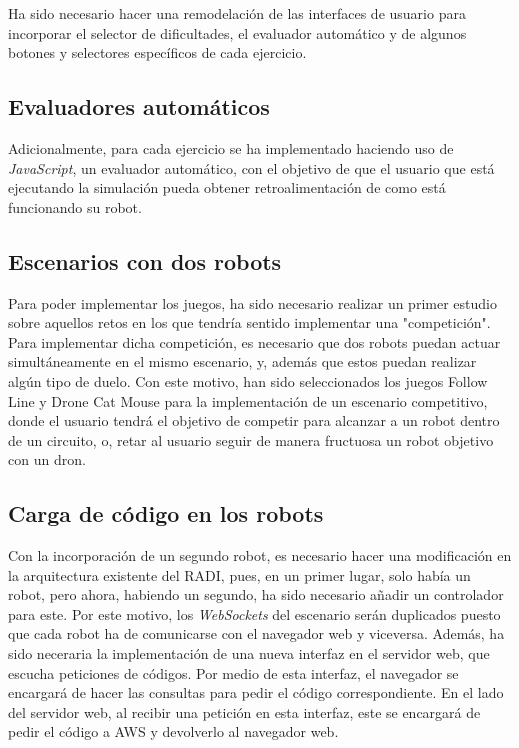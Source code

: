 \documentclass[a4paper, 12pt]{book}
\begin{document}
Ha sido necesario hacer una remodelación de las interfaces de usuario para incorporar el selector de dificultades, el evaluador automático y de algunos botones y selectores específicos de cada ejercicio.

\subsection{Evaluadores automáticos}

Adicionalmente, para cada ejercicio se ha implementado haciendo uso de \emph{JavaScript}, un evaluador automático, con el objetivo de que el usuario que está ejecutando la simulación pueda obtener retroalimentación de como está funcionando su robot.

\subsection{Escenarios con dos robots}

Para poder implementar los juegos, ha sido necesario realizar un primer estudio sobre aquellos retos en los que tendría sentido implementar una "competición".  Para implementar dicha competición, es necesario que dos robots puedan actuar simultáneamente en el mismo escenario, y, además que estos puedan realizar algún tipo de duelo. Con este motivo, han sido seleccionados los juegos Follow Line y Drone Cat Mouse para la implementación de un escenario competitivo, donde el usuario tendrá el objetivo de competir para alcanzar a un robot dentro de un circuito, o, retar al usuario seguir de manera fructuosa un robot objetivo con un dron.

\subsection{Carga de código en los robots}

Con la incorporación de un segundo robot, es necesario hacer una modificación en la arquitectura existente del RADI, pues, en un primer lugar, solo había un robot, pero ahora, habiendo un segundo, ha sido necesario añadir un controlador para este. Por este motivo, los \emph{WebSockets} del escenario serán duplicados puesto que cada robot ha de comunicarse con el navegador web y viceversa. Además, ha sido neceraria la implementación de una nueva interfaz en el servidor web, que escucha peticiones de códigos. Por medio de esta interfaz, el navegador se encargará de hacer las consultas para pedir el código correspondiente. En el lado del servidor web, al recibir una petición en esta interfaz, este se encargará de pedir el código a AWS y devolverlo al navegador web.
\end{document}
